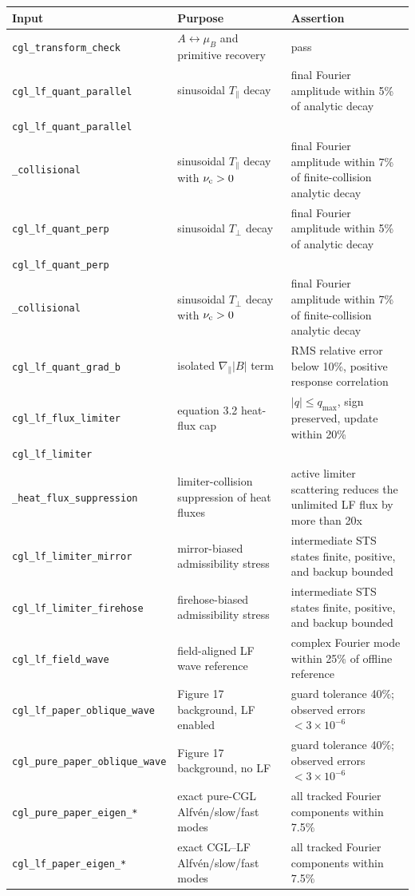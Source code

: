 \documentclass[11pt]{article}
\begin{document}
\begin{table}[htbp]
\centering
\small
\begin{tabular}{p{}p{}p{}}
\toprule
Input & Purpose & Assertion \\
\midrule
\texttt{cgl\_transform\_check} & \(A \leftrightarrow \mu_B\) and primitive recovery
  & pass \\
\texttt{cgl\_lf\_quant\_parallel} & sinusoidal \(T_\parallel\) decay
  & final Fourier amplitude within 5\% of analytic decay \\
\texttt{cgl\_lf\_quant\_parallel}\\\texttt{\_collisional} & sinusoidal \(T_\parallel\) decay with \(\nu_{\rm c}>0\)
  & final Fourier amplitude within 7\% of finite-collision analytic decay \\
\texttt{cgl\_lf\_quant\_perp} & sinusoidal \(T_\perp\) decay
  & final Fourier amplitude within 5\% of analytic decay \\
\texttt{cgl\_lf\_quant\_perp}\\\texttt{\_collisional} & sinusoidal \(T_\perp\) decay with \(\nu_{\rm c}>0\)
  & final Fourier amplitude within 7\% of finite-collision analytic decay \\
\texttt{cgl\_lf\_quant\_grad\_b} & isolated \(\nabla_\parallel |B|\) term
  & RMS relative error below 10\%, positive response correlation \\
\texttt{cgl\_lf\_flux\_limiter} & equation 3.2 heat-flux cap
  & \(|q|\le q_{\max}\), sign preserved, update within 20\% \\
\texttt{cgl\_lf\_limiter}\\\texttt{\_heat\_flux\_suppression} & limiter-collision suppression of heat fluxes
  & active limiter scattering reduces the unlimited LF flux by more than 20x \\
\texttt{cgl\_lf\_limiter\_mirror} & mirror-biased admissibility stress
  & intermediate STS states finite, positive, and backup bounded \\
\texttt{cgl\_lf\_limiter\_firehose} & firehose-biased admissibility stress
  & intermediate STS states finite, positive, and backup bounded \\
\texttt{cgl\_lf\_field\_wave} & field-aligned LF wave reference
  & complex Fourier mode within 25\% of offline reference \\
\texttt{cgl\_lf\_paper\_oblique\_wave} & Figure 17 background, LF enabled
  & guard tolerance 40\%; observed errors \(<3\times10^{-6}\) \\
\texttt{cgl\_pure\_paper\_oblique\_wave} & Figure 17 background, no LF
  & guard tolerance 40\%; observed errors \(<3\times10^{-6}\) \\
\texttt{cgl\_pure\_paper\_eigen\_*} & exact pure-CGL Alfvén/slow/fast modes
  & all tracked Fourier components within 7.5\% \\
\texttt{cgl\_lf\_paper\_eigen\_*} & exact CGL--LF Alfvén/slow/fast modes
  & all tracked Fourier components within 7.5\% \\
\bottomrule
\end{tabular}
\end{table}
\end{document}
